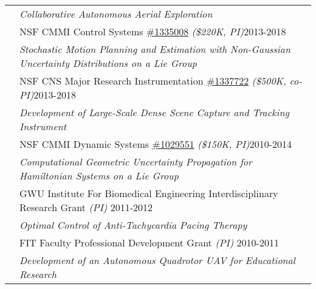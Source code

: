 \documentclass[10pt]{article}
\begin{document}
\begin{tabularx}{\textwidth}{>{\setlength{\hsize}{0.5cm}}X X}
& \quad\textit{Collaborative Autonomous Aerial Exploration} \vspace*{0.08cm}\\
%     
& NSF CMMI Control Systems \href{http://www.nsf.gov/awardsearch/showAward?AWD_ID=1335008}{\#1335008} \textit{(\$220K, PI)}\hfill 2013-2018 \\
& \quad\textit{Stochastic Motion Planning and Estimation with Non-Gaussian Uncertainty Distributions on a Lie Group} \vspace*{0.08cm}\\
%
& NSF CNS Major Research Instrumentation \href{http://www.nsf.gov/awardsearch/showAward?AWD_ID=1337722}{\#1337722} \textit{(\$500K, co-PI)}\hfill 2013-2018 \\
& \quad\textit{Development of Large-Scale Dense Scene Capture and Tracking Instrument} \vspace*{0.08cm}\\
%
& NSF CMMI Dynamic Systems \href{http://www.nsf.gov/awardsearch/showAward.do?AwardNumber=1029551}{\#1029551} \textit{(\$150K, PI)}\hfill 2010-2014 \\
& \quad\textit{Computational Geometric Uncertainty Propagation for Hamiltonian Systems on a Lie Group} \vspace*{0.08cm}\\
%
& GWU Institute For Biomedical Engineering
Interdisciplinary Research Grant \textit{(PI)}
 \hfill 2011-2012 \\
& \quad\textit{Optimal Control of Anti-Tachycardia Pacing Therapy}\vspace*{0.08cm}\\
%
& FIT Faculty Professional Development Grant \textit{(PI)}
 \hfill 2010-2011 \\
& \quad\textit{Development of an Autonomous Quadrotor UAV for Educational Research}\vspace*{0.08cm}\\
%
%
\end{tabularx}
\end{document}
